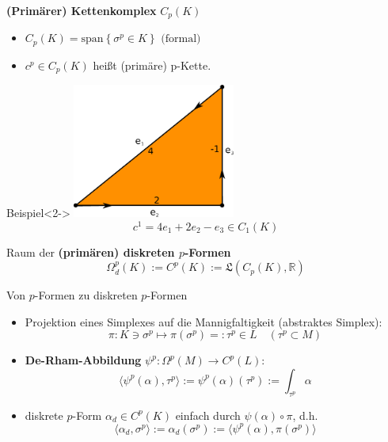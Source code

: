 \documentclass[handout]{beamer}
\newcommand{\R}{\mathds{R}}
\begin{document}
  \begin{frame}
    \begin{block}{\textbf{{}(Primärer) Kettenkomplex} \( C_{p}(K) \)}
      \begin{itemize}
        \item \( C_{p}(K) = \text{span}\left\{ \sigma^{p} \in K \right\} \text{ (formal)}\)
        \item<2-> \( c^{p} \in C_{p}(K) \) heißt (primäre) p-Kette.
      \end{itemize}
    \end{block}
    \begin{block}{Beispiel}<2->
      \centering\includegraphics[width=0.4\textwidth]{bilder/inkscape/bspKette.eps}
      \[ c^{1} =  4e_{1} + 2e_{2} - e_{3} \in C_{1}(K) \]
    \end{block}
  \end{frame}

  \begin{frame}
    \begin{block}{Raum der \textbf{(primären) diskreten \( p \)-Formen} }
      \[ \Omega^{p}_{d}(K) := C^{p}(K) := \mathfrak{L}(C_{p}(K), \R) \]
    \end{block}
    \pause
    \begin{block}{Von \( p \)-Formen zu diskreten \( p \)-Formen}
      \begin{itemize}
        \item Projektion eines Simplexes auf die Mannigfaltigkeit (abstraktes Simplex):
          \[ \pi: K \ni \sigma^{p} \longmapsto \pi(\sigma^{p}) =: \tau^{p} \in L \quad (\tau^{p} \subset M)  \]
        \item<3-> \textbf{De-Rham-Abbildung} \( \psi^{p}: \Omega^{p}(M) \rightarrow C^{p}(L)\):
          \[ \langle\psi^{p}(\alpha) , \tau^{p} \rangle := \psi^{p}(\alpha)(\tau^{p}) :=\int_{\tau^{p}} \alpha  \]
        \item<4-> diskrete \( p \)-Form \( \alpha_{d} \in C^{p}(K)\) einfach durch \( \psi(\alpha)\circ\pi \), d.h. 
          \[ \langle \alpha_{d} , \sigma^{p} \rangle := \alpha_{d}(\sigma^{p}) := \langle \psi^{p}(\alpha) , \pi(\sigma^{p}) \rangle\]
      \end{itemize}
    \end{block}
  \end{frame}
 
\end{document}
